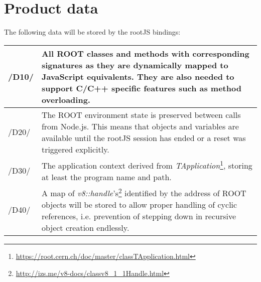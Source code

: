 \chapter{Product data}

The following data will be stored by the rootJS bindings: \\

\begin{longtable}{|p{1cm} | p{15cm}|}
\hline
/D10/ & All ROOT classes and methods with corresponding signatures as they are dynamically mapped to JavaScript equivalents. They are also needed to support C/C++ specific features such as method overloading.\\
\hline
/D20/ & The ROOT environment state is preserved between calls from Node.js. This means that objects and variables are available until the rootJS session has ended or a reset was triggered explicitly.\\
\hline
/D30/ & The application context derived from \textit{TApplication}\footnote{\url{https://root.cern.ch/doc/master/classTApplication.html}}, storing at least the program name and path.\\
\hline
/D40/ & A map of \textit{v8::handle}'s\footnote{\url{http://izs.me/v8-docs/classv8_1_1Handle.html}} identified by the address of ROOT objects will be stored to allow proper handling of cyclic references, i.e. prevention of stepping down in recursive object creation endlessly.\\
\hline
\end{longtable}